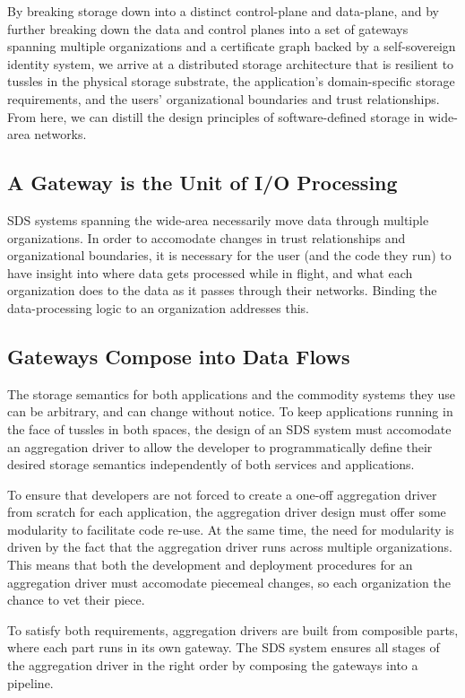 By breaking storage down into a distinct control-plane and data-plane, and by
further breaking down the data and control planes into a set of gateways spanning multiple
organizations and a certificate graph backed by a self-sovereign identity system,
we arrive at a distributed storage architecture that is resilient
to tussles in the physical storage substrate, the application's
domain-specific storage requirements, and the users' organizational boundaries
and trust relationships.  From here, we can distill the design principles of
software-defined storage in wide-area networks.

\subsection{A Gateway is the Unit of I/O Processing}

SDS systems spanning the wide-area necessarily move data through multiple
organizations.  In order to accomodate changes in trust relationships
and organizational boundaries, it is necessary for the user (and the code they
run) to have insight into where data gets processed while in flight, and what
each organization does to the data as it passes through their networks.  Binding
the data-processing logic to an organization addresses this.

\subsection{Gateways Compose into Data Flows}

The storage semantics for both applications and the commodity systems they use can be
arbitrary, and can change without notice.  To keep applications running in the
face of tussles in both spaces, the design of an SDS system must
accomodate an aggregation driver
to allow the developer to programmatically define
their desired storage semantics independently of both services and
applications.

To ensure that developers
are not forced to create a one-off aggregation driver from scratch for each
application, the aggregation driver design must offer some modularity to
facilitate code re-use.  At the same time, the need for modularity is driven by
the fact that the aggregation driver runs across multiple organizations.
This means that both the development and deployment procedures for
an aggregation driver must accomodate piecemeal
changes, so each organization the chance to vet their piece.

To satisfy both requirements, aggregation drivers
are built from composible parts, where each part runs in its own gateway.
The SDS system ensures all stages of the aggregation driver in the right order
by composing the gateways into a pipeline.

